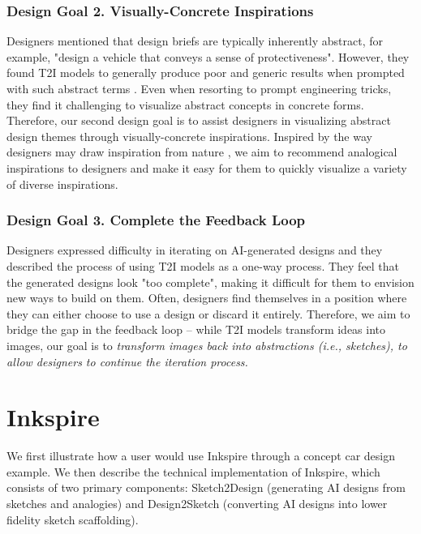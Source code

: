 \documentclass[sigconf, screen]{acmart}
\begin{document}
\subsubsection{Design Goal 2. Visually-Concrete Inspirations}

Designers mentioned that design briefs are typically inherently abstract, for example, "design a vehicle that conveys a sense of protectiveness". However, they found T2I models to generally produce poor and generic results when prompted with such abstract terms \cite{xie2023prompt}. Even when resorting to prompt engineering tricks, they find it challenging to visualize abstract concepts in concrete forms. Therefore, our second design goal is to assist designers in visualizing abstract design themes through visually-concrete inspirations. Inspired by the way designers may draw inspiration from nature \cite{deldin2013asknature}, we aim to recommend analogical inspirations \cite{kang2023biospark} to designers and make it easy for them to quickly visualize a variety of diverse inspirations.

\subsubsection{Design Goal 3. Complete the Feedback Loop}

Designers expressed difficulty in iterating on AI-generated designs and they described the process of using T2I models as a one-way process. They feel that the generated designs look "too complete", making it difficult for them to envision new ways to build on them. Often, designers find themselves in a position where they can either choose to use a design or discard it entirely. Therefore, we aim to bridge the gap in the feedback loop -- while T2I models transform ideas into images, our goal is to \textit{transform images back into abstractions (i.e., sketches), to allow designers to continue the iteration process.}


\section{Inkspire}
\label{section:implementation}
We first illustrate how a user would use Inkspire through a concept car design example.
We then describe the technical implementation of Inkspire, which consists of two primary components: Sketch2Design (generating AI designs from sketches and analogies) and Design2Sketch (converting AI designs into lower fidelity sketch scaffolding).
\end{document}
